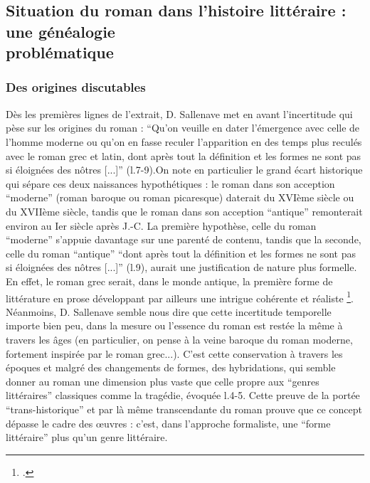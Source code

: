 \documentclass[a4paper,10pt]{article}
\begin{document}
		\subsection{Situation du roman dans l'histoire littéraire : une généalogie\\ problématique}
			\subsubsection{Des origines discutables}
				Dès les premières lignes de l'extrait, D. Sallenave met en avant l'incertitude qui pèse sur les origines du roman : ``Qu'on veuille en dater l'émergence avec celle de l'homme moderne ou qu'on en fasse reculer l'apparition en des temps plus reculés avec le roman grec et latin, dont après tout la définition et les formes ne sont pas si éloignées des nôtres [...]'' (l.7-9).On note en particulier le grand écart historique qui sépare ces deux naissances hypothétiques : le roman dans son acception ``moderne'' (roman baroque ou roman picaresque) daterait du XVIème siècle ou du XVIIème siècle, tandis que le roman dans son acception ``antique'' remonterait environ au Ier siècle après J.-C. La première hypothèse, celle du roman ``moderne'' s'appuie davantage sur une parenté de contenu, tandis que la seconde, celle du roman ``antique'' ``dont après tout la définition et les formes ne sont pas si éloignées des nôtres [...]'' (l.9), aurait une justification de nature plus formelle.  En effet, le roman grec serait, dans le monde antique, la première forme de littérature en prose développant par ailleurs une intrigue cohérente et réaliste \footcite{WikiRomanGrec}.\\
				Néanmoins, D. Sallenave semble nous dire que cette incertitude temporelle importe bien peu, dans la mesure ou l'essence du roman est restée la même à travers les âges (en particulier, on pense à la veine baroque du roman moderne, fortement inspirée par le roman grec...). C'est cette conservation à travers les époques et malgré des changements de formes, des hybridations, qui semble donner au roman une dimension plus vaste que celle propre aux ``genres littéraires'' classiques comme la tragédie, évoquée l.4-5. Cette preuve de la portée ``trans-historique'' et par là même transcendante du roman prouve que ce concept dépasse le cadre des œuvres : c'est, dans l'approche formaliste, une ``forme littéraire'' plus qu'un genre littéraire.
\end{document}
